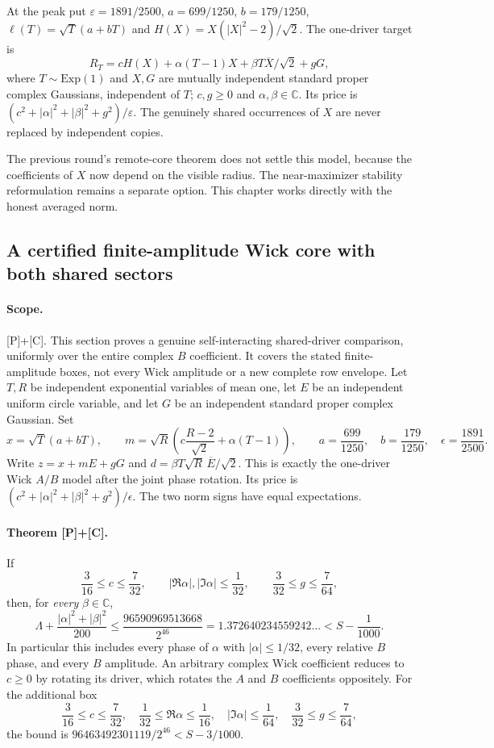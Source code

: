 At the peak put $\varepsilon=1891/2500$, $a=699/1250$, $b=179/1250$, $\ell(T)=\sqrt T(a+bT)$ and $H(X)=X(|X|^2-2)/\sqrt2$. The one-driver target is
\[
R_T=cH(X)+\alpha(T-1)X+\beta T\overline X/\sqrt2+gG,
\]
where $T\sim\mathrm{Exp}(1)$ and $X,G$ are mutually independent standard proper complex Gaussians, independent of $T$; $c,g\ge0$ and $\alpha,\beta\in\mathbb C$. Its price is $(c^2+|\alpha|^2+|\beta|^2+g^2)/\varepsilon$. The genuinely shared occurrences of $X$ are never replaced by independent copies.

The previous round's remote-core theorem does not settle this model, because the coefficients of $X$ now depend on the visible radius. The near-maximizer stability reformulation remains a separate option. This chapter works directly with the honest averaged norm.

\subsection{A certified finite-amplitude Wick core with both shared sectors}
\label{sec:wick-ab-exterior-box}

\paragraph{Scope.} [P]+[C]. This section proves a genuine self-interacting
shared-driver comparison, uniformly over the entire complex $B$ coefficient.
It covers the stated finite-amplitude boxes, not every Wick amplitude or a
new complete row envelope. Let $T,R$ be independent exponential variables
of mean one, let $E$ be an independent uniform circle variable, and let $G$
be an independent standard proper complex Gaussian. Set
\[
 x=\sqrt T(a+bT),\qquad
 m=\sqrt R\left(c\frac{R-2}{\sqrt2}+\alpha(T-1)\right),
 \qquad a=\frac{699}{1250},\quad b=\frac{179}{1250},\quad
 \epsilon=\frac{1891}{2500}.
\]
Write $z=x+mE+gG$ and $d=\beta T\sqrt R\,\overline E/\sqrt2$.
This is exactly the one-driver Wick $A/B$ model after the joint phase
rotation. Its price is $(c^2+|\alpha|^2+|\beta|^2+g^2)/\epsilon$.
The two norm signs have equal expectations.

\paragraph{Theorem [P]+[C].}
If
\[
 \frac3{16}\le c\le\frac7{32},\qquad
 |\Re\alpha|,|\Im\alpha|\le\frac1{32},\qquad
 \frac3{32}\le g\le\frac7{64},
\]
then, for \emph{every} $\beta\in\mathbb C$,
\[
 \Lambda+\frac{|\alpha|^2+|\beta|^2}{200}
 \le\frac{96590969513668}{2^{46}}
       =1.372640234559242\ldots<S-\frac1{1000}.
\]
In particular this includes every phase of $\alpha$ with
$|\alpha|\le1/32$, every relative $B$ phase, and every $B$ amplitude.
An arbitrary complex Wick coefficient reduces to $c\ge0$ by rotating
its driver, which rotates the $A$ and $B$ coefficients oppositely.
For the additional box
\[
 \frac3{16}\le c\le\frac7{32},\quad
 \frac1{32}\le\Re\alpha\le\frac1{16},\quad
 |\Im\alpha|\le\frac1{64},\quad
 \frac3{32}\le g\le\frac7{64},
\]
the bound is $96463492301119/2^{46}<S-3/1000$.

